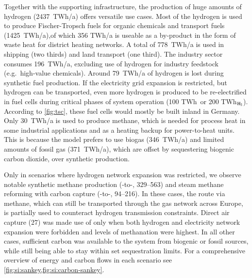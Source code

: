 Together with the supporting infrastructure, the production of huge amounts of
hydrogen (2437~TWh/a) offers versatile use cases. Most of the hydrogen is used
to produce Fischer-Tropsch fuels for organic chemicals and transport fuels
(1425~TWh/a),of which 356 TWh/a is useable as a by-product in the form of waste
heat for district heating networks. A total of 778~TWh/a is used in shipping
(two thirds) and land transport (one third). The industry sector consumes
196~TWh/a, excluding use of hydrogen for industry feedstock (e.g.~high-value
chemicals). Around 79~TWh/a of hydrogen is lost during synthetic fuel
production. If the electricity grid expansion is restricted, but hydrogen can be
transported, even more hydrogen is produced to be re-electrified in fuel cells
during critical phases of system operation (100 TWh\el~or 200 TWh$_{\ce{H2}}$).
According to \cref{fig:tsc}, these fuel cells would mostly be built inland in
Germany. Only 30~TWh/a is used to produce methane, which is needed for process
heat in some industrial applications and as a heating backup for power-to-heat
units. This is because the model prefers to use biogas (346~TWh/a) and limited
amounts of fossil gas (371~TWh/a), which are offset by sequestering biogenic
carbon dioxide, over synthetic production.

Only in scenarios where hydrogen network expansion was restricted, we observe
notable synthetic methane production (-to-,
\SIrange{329}{563}{\twh}) and steam methane reforming with carbon capture
(-to-, \SIrange{94}{216}{\twh}). In these cases, the route via
methane, which can still be transported through the gas network across Europe,
is partially used to counteract hydrogen transmission constraints. Direct air
capture (\SI{27}{\tco}) was made use of only when both hydrogen and electricity
network expansion were forbidden and levels of methanation were highest. In all
other cases, sufficient carbon was available to the system from biogenic or
fossil sources, while still being able to stay within set sequestration limits.
For a comprehensive overview of energy and carbon flows in each scenario see
\cref{fig:si:sankey,fig:si:carbon-sankey}.

